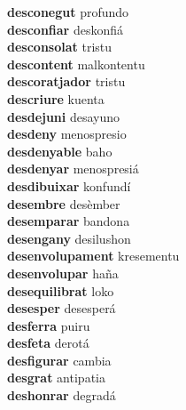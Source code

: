 \textbf{desconegut } profundo \\
\textbf{desconfiar } deskonfiá \\
\textbf{desconsolat } tristu \\
\textbf{descontent } malkontentu \\
\textbf{descoratjador } tristu \\
\textbf{descriure } kuenta \\
\textbf{desdejuni } desayuno \\
\textbf{desdeny } menospresio \\
\textbf{desdenyable } baho \\
\textbf{desdenyar } menospresiá \\
\textbf{desdibuixar } konfundí \\
\textbf{desembre } desèmber \\
\textbf{desemparar } bandona \\
\textbf{desengany } desilushon \\
\textbf{desenvolupament } kresementu \\
\textbf{desenvolupar } haña \\
\textbf{desequilibrat } loko \\
\textbf{desesper } desesperá \\
\textbf{desferra } puiru \\
\textbf{desfeta } derotá \\
\textbf{desfigurar } cambia \\
\textbf{desgrat } antipatia \\
\textbf{deshonrar } degradá \\
